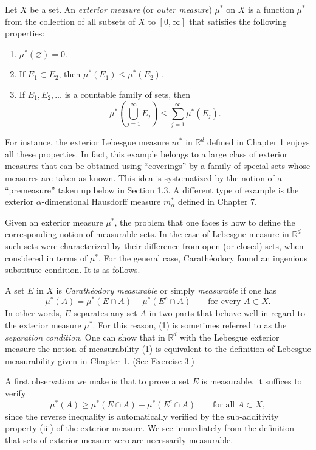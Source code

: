 \documentclass[11pt,openany]{book}
\begin{document}
Let $X$ be a set. An \emph{exterior measure} (or \emph{outer measure}) $\mu^*$ on $X$ is a function $\mu^*$ from the collection of all subsets of $X$ to $[0,\infty]$ that satisfies the following properties:
\begin{enumerate}
\item[(i)] $\mu^*(\varnothing)=0$.
\item[(ii)] If $E_1\subset E_2$, then $\mu^*(E_1)\leq \mu^*(E_2)$.
\item[(iii)] If $E_1,E_2,\ldots$ is a countable family of sets, then
\[
\mu^*\left(\bigcup_{j=1}^{\infty}E_j\right)\leq\sum_{j=1}^{\infty}\mu^*(E_j).
\]
\end{enumerate}
For instance, the exterior Lebesgue measure $m^*$ in $\mathbb R^d$ defined in Chapter 1 enjoys all these properties. In fact, this example belongs to a large class of exterior measures that can be obtained using ``coverings'' by a family of special sets whose measures are taken as known. This idea is systematized by the notion of a ``premeasure'' taken up below in Section 1.3. A different type of example is the exterior $\alpha$-dimensional Hausdorff measure $m^*_{\alpha}$ defined in Chapter 7.

Given an exterior measure $\mu^*$, the problem that one faces is how to define the corresponding notion of measurable sets. In the case of Lebesgue measure in $\mathbb R^d$ such sets were characterized by their difference from open (or closed) sets, when considered in terms of $\mu^*$. For the general case, Carath\'eodory found an ingenious substitute condition. It is as follows.

A set $E$ in $X$ is \emph{Carath\'eodory measurable} or simply \emph{measurable} if one has
\begin{equation}
\mu^*(A)=\mu^*(E\cap A)+\mu^*(E^c\cap A)\qquad\text{for every }A\subset X.
\tag{1}
\end{equation}
In other words, $E$ separates any set $A$ in two parts that behave well in regard to the exterior measure $\mu^*$. For this reason, (1) is sometimes referred to as the \emph{separation condition}. One can show that in $\mathbb R^d$ with the Lebesgue exterior measure the notion of measurability (1) is equivalent to the definition of Lebesgue measurability given in Chapter 1. (See Exercise 3.)

A first observation we make is that to prove a set $E$ is measurable, it suffices to verify
\[
\mu^*(A)\geq \mu^*(E\cap A)+\mu^*(E^c\cap A)\qquad\text{for all }A\subset X,
\]
since the reverse inequality is automatically verified by the sub-additivity property (iii) of the exterior measure. We see immediately from the definition that sets of exterior measure zero are necessarily measurable.
\end{document}
